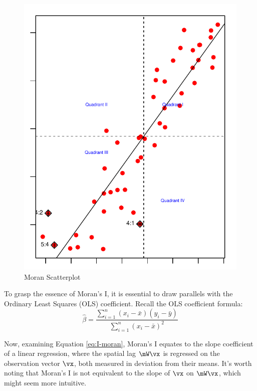 \begin{figure}[ht]
  \caption{Moran Scatterplot}\label{fig:moran_scatterplot}
\begin{knitrout}
\color{fgcolor}

{\centering \includegraphics[width=\maxwidth]{figure/moran-1} 

}


\end{knitrout}
\end{figure}


To grasp the essence of Moran's I, it is essential to draw parallels with the Ordinary Least Squares (OLS) coefficient. Recall the OLS coefficient formula:
\begin{equation*}
  \widehat{\beta}= \frac{\sum_{i = 1}^n\left(x_i - \bar{x}\right)(y_i - \bar{y})}{\sum_{i = 1}^n \left(x_i - \bar{x}\right)^2}
\end{equation*}

Now, examining Equation \eqref{eq:I-moran}, Moran's I equates to the slope coefficient of a linear regression, where the spatial lag $\mW\vx$ is regressed on the observation vector $\vx$, both measured in deviation from their means. It's worth noting that Moran's I is not equivalent to the slope of $\vx$ on $\mW\vx$, which might seem more intuitive.


